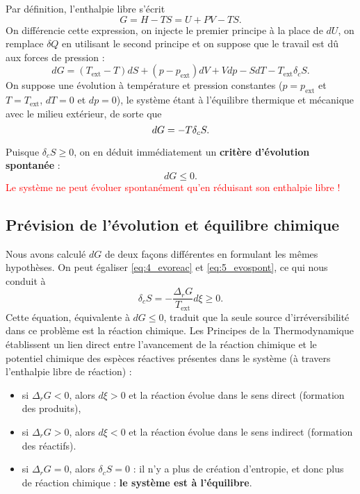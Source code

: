 \documentclass[11pt,a4paper]{report}
\begin{document}
Par définition, l'enthalpie libre s'écrit
\begin{equation}
	G = H - TS = U + PV - TS.
\end{equation} 
On différencie cette expression, on injecte le premier principe à la place de $dU$, on remplace $\delta Q$ en utilisant le second principe et on suppose que le travail est dû aux forces de pression :
\begin{equation}
	dG = (T_\text{ext} - T)dS + (p - p_\text{ext})dV + Vdp - SdT - T_\text{ext}\delta_c S.
\end{equation}
On suppose une évolution à température et pression constantes ($p = p_\text{ext}$ et $T = T_\text{ext}$, $dT = 0$ et $dp = 0$), le système étant à l'équilibre thermique et mécanique avec le milieu extérieur, de sorte que
\begin{equation}
	dG = - T \delta_c S.\\
	\label{eq:5_evospont}
\end{equation}

Puisque $\delta_c S \geq 0$, on en déduit immédiatement un \textbf{critère d'évolution spontanée} :
\begin{equation}
	\boxed{dG \leq 0}.
\end{equation}
\textcolor{red}{Le système ne peut évoluer spontanément qu'en réduisant son enthalpie libre !}

\subsection{Prévision de l'évolution et équilibre chimique}

Nous avons calculé $dG$ de deux façons différentes en formulant les mêmes hypothèses. On peut égaliser \eqref{eq:4_evoreac} et \eqref{eq:5_evospont}, ce qui nous conduit à
\begin{equation}
	\delta_c S = - \frac{\Delta_r G}{T_\text{ext}}d\xi \geq 0.
\end{equation}
Cette équation, équivalente à $dG \leq 0$, traduit que la seule source d'irréversibilité dans ce problème est la réaction chimique. Les Principes de la Thermodynamique établissent un lien direct entre l'avancement de la réaction chimique et le potentiel chimique des espèces réactives présentes dans le système (à travers l'enthalpie libre de réaction) :
\begin{itemize}
	\item si $\Delta_r G < 0$, alors $d\xi > 0$ et la réaction évolue dans le sens direct (formation des produits),
	\item si $\Delta_r G > 0$, alors $d\xi < 0$ et la réaction évolue dans le sens indirect (formation des réactifs).
	\item si $\Delta_r G = 0$, alors $\delta_c S = 0$ : il n'y a plus de création d'entropie, et donc plus de réaction chimique : \textbf{le système est à l'équilibre}.
\end{itemize}
\end{document}
